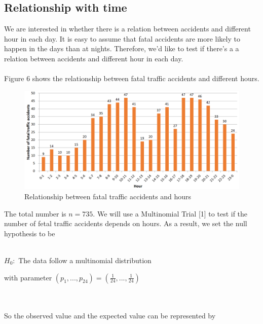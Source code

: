 \documentclass[a4paper,12pt]{article}
\begin{document}
\subsection{Relationship with time}
\noindent  We are interested in whether there is a relation between accidents and different hour in each day. It is easy to assume that fatal accidents are more likely to happen in the days than at nights. Therefore, we'd like to test if there's a a relation between accidents and different hour in each day.\\\\Figure 6 shows the relationship between fatal traffic accidents and different hours.\\ \newpage
\begin{figure}[hbp]
\centering
\includegraphics[scale=0.65]{hour.PNG}
\caption{Relationship between fatal traffic accidents and  hours}
\end{figure}
\noindent The total number is $n=735$. We will use a Multinomial Trial [1] to test if the number of fetal traffic accidents depends on hours.
As a result, we set the null hypothesis to be\\\\
\centerline{$H_0:$ The data follow a multinomial distribution}
\centerline{with parameter $(p_1,...,p_{24})=(\frac{1}{24},...,\frac{1}{24})$}
 \\\\So the observed value and the expected value can be represented by
\end{document}
